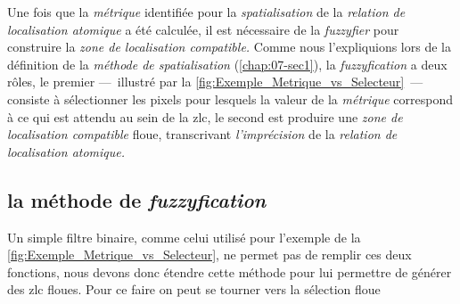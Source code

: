 Une fois que la \emph{métrique} identifiée pour la \emph{spatialisation} de la \emph{relation de localisation atomique} a été calculée, il est nécessaire de la \emph{fuzzyfier} pour construire la \emph{zone de localisation compatible.} Comme nous l'expliquions lors de la définition de la \emph{méthode de spatialisation} (\autoref{chap:07-sec1}), la \emph{fuzzyfication} a deux rôles, le premier ---~illustré par la \autoref{fig:Exemple_Metrique_vs_Selecteur}~--- consiste à sélectionner les pixels pour lesquels la valeur de la \emph{métrique} correspond à ce qui est attendu au sein de la \ac{zlc}, le second est produire une \emph{zone de localisation compatible} floue, transcrivant \emph{l'imprécision} de la \emph{relation de localisation atomique.}

\subsection{la méthode de \emph{fuzzyfication}}

Un simple filtre binaire, comme celui utilisé pour l'exemple de la \autoref{fig:Exemple_Metrique_vs_Selecteur}, ne permet pas de remplir ces deux fonctions, nous devons donc étendre cette méthode pour lui permettre de générer des \ac{zlc} floues. Pour ce faire on peut se tourner vers la sélection floue

